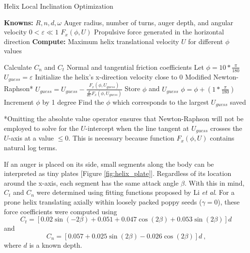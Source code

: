 \documentclass[letterpaper, 11 pt]{article}
\begin{document}
\begin{algorithm}[H]
	\caption{Helix Local Inclination Optimization}
	\label{augerOpt}
	
	\begin{algorithmic} %
	\State \textbf{Knowns:}
	\State $R, n, d, \omega$ \Comment Auger radius, number of turns, auger depth, and angular velocity
	\State $0<\varepsilon \ll 1$
	\State $F_x(\phi,U)$ \Comment Propulsive force generated in the horizontal direction
	\State
	\State \textbf{Compute:} Maximum helix translational velocity $U$ for different $\phi$ values
	\end{algorithmic}
	
	\begin{algorithmic}[1] %
	\State Calculate $C_n$ and $C_t$ \Comment Normal and tangential friction coefficients 
	\State Let $\phi = 10*\frac{\pi}{180}$
		\State $U_{guess} = \varepsilon$ \Comment Initialize the helix's x-direction velocity close to 0 
		 \Comment Modified Newton-Raphson*
			\State $U_{guess} = U_{guess} - \frac{F_x(\phi, U_{guess})}{\frac{d}{dU}F_x(\phi,U_{guess})}$
		\EndWhile
		\State Store $\phi$ and $U_{guess}$ 
		\State $\phi = \phi + (1*\frac{\pi}{180})$ \Comment Increment $\phi$ by 1 degree
	\EndWhile
	\State Find the $\phi$ which corresponds to the largest $U_{guess}$ saved
	\end{algorithmic}
\end{algorithm}
*Omitting the absolute value operator ensures that Newton-Raphson will not be employed to solve for the $U$-intercept when the line tangent at $U_{guess}$ crosses the $U$-axis at a value $\leq 0$. This is necessary because function $F_x(\phi,U)$ contains natural log terms.   

\medskip
If an auger is placed on its side, small segments along the body can be interpreted as tiny plates [Figure \ref{fig:helix_plate}]. Regardless of its location around the x-axis, each segment has the same attack angle $\beta$. With this in mind, $C_t$ and $C_n$ were determined using fitting functions proposed by Li \textit{et al}. For a prone helix translating axially within loosely packed poppy seeds ($\gamma = 0$), these force coefficients were computed using 
\begin{equation}\label{chenCt}
C_t = \left[0.02\sin(-2\beta)+0.051+0.047\cos(2\beta)+0.053\sin(2\beta) \right]d
\end{equation}
and
\begin{equation}\label{chenCn}
C_n = \left[0.057+0.025\sin(2\beta)-0.026\cos(2\beta) \right]d\ \text{,}
\end{equation}
where $d$ is a known depth. 
\end{document}
